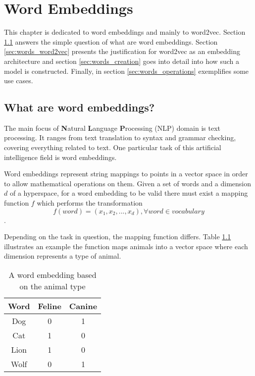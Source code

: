 \chapter{Word Embeddings}
\label{chap:words}

This chapter is dedicated to word embeddings and mainly to word2vec. Section \ref{sec:words_what} answers the simple question of what are word embeddings. Section \ref{sec:words_word2vec} presents the justification for word2vec as an embedding architecture and section \ref{sec:words_creation} goes into detail into how such a model is constructed. Finally, in section \ref{sec:words_operations} exemplifies some use cases.

\section{What are word embeddings?}
\label{sec:words_what}

The main focus of \textbf{N}atural \textbf{L}anguage \textbf{P}rocessing (NLP) domain is text processing. It ranges from text translation to syntax and grammar checking, covering everything related to text. One particular task of this artificial intelligence field is word embeddings.

Word embeddings represent string mappings to points in a vector space in order to allow mathematical operations on them. Given a set of words and a dimension $d$ of a hyperspace, for a word embedding to be valid there must exist a mapping function $f$ which performs the transformation $$ f(word) = (x_1, x_2, ... , x_d),  \forall word \in vocabulary$$. 

Depending on the task in question, the mapping function differs. Table \ref{table:embedding} illustrates an example the function maps animals into a vector space where each dimension represents a type of animal.

\begin{table}[b!]
\centering
\label{table:embedding}
\begin{tabular}{| | c c c | |}
	\hline
		 Word & Feline & Canine \\
	\hline
		Dog & 0 & 1 \\
		Cat  & 1 & 0 \\
		Lion & 1 & 0 \\
		Wolf & 0 & 1 \\
\hline
\end{tabular}
\caption{A word embedding based on the animal type}
\end{table}

